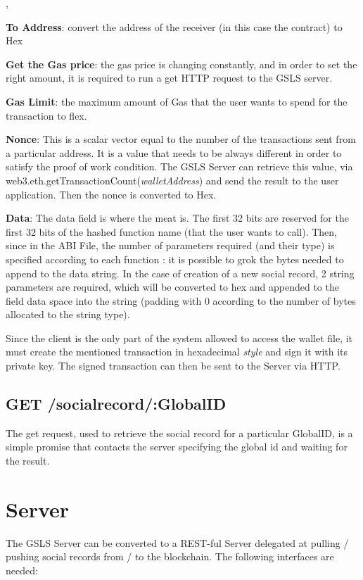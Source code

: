 \begin{list}{},
  \item \textbf{To Address}: convert the address of the receiver (in this case the contract) to Hex
  \item \textbf{Get the Gas price}: the gas price is changing constantly, and in order to set the right amount, it is required to run a get HTTP request to the GSLS server.
  \item \textbf{Gas Limit}: the maximum amount of Gas that the user wants to spend for the transaction to flex.
  \item \textbf{Nonce}: This is a scalar vector equal to the number of the transactions sent from a particular address. It is a value that needs to be always different in order to satisfy the proof of work condition.
  The GSLS Server can retrieve this value, via web3.eth.getTransactionCount(\textit{walletAddress}) and send the result to the user application. Then the nonce is converted to Hex.
  \item \textbf{Data}: The data field is where the meat is. The first 32 bits are reserved for the first 32 bits of the hashed function name (that the user wants to call).
  Then, since in the ABI File, the number of parameters required (and their type) is specified  according to each function : it is possible to grok the bytes needed to append to the data string.
  In the case of creation of a new social record, 2 string parameters are required, which will be converted to hex and appended to the field data space into the string (padding with 0 according to the number of bytes allocated to the string type).
\end{list}

Since the client is the only part of the system allowed to access the wallet file, it must create the mentioned transaction in hexadecimal \textit{style} and sign it with its private key.
The signed transaction can then be sent to the Server via HTTP.

\subsection{GET /socialrecord/:GlobalID}
The get request, used to retrieve the social record for a particular GlobalID, is a simple promise that contacts the server specifying the global id and waiting for the result.

\section{Server}
The GSLS Server can be converted to a REST-ful Server delegated at pulling / pushing social records from / to the blockchain.
The following interfaces are needed:
